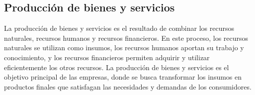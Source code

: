 \documentclass[
  letterpaper,
  DIV=11,
  numbers=noendperiod]{scrartcl}
\begin{document}
\hypertarget{producciuxf3n-de-bienes-y-servicios}{%
\subsection{Producción de bienes y
servicios}\label{producciuxf3n-de-bienes-y-servicios}}

La producción de bienes y servicios es el resultado de combinar los
recursos naturales, recursos humanos y recursos financieros. En este
proceso, los recursos naturales se utilizan como insumos, los recursos
humanos aportan su trabajo y conocimiento, y los recursos financieros
permiten adquirir y utilizar eficientemente los otros recursos. La
producción de bienes y servicios es el objetivo principal de las
empresas, donde se busca transformar los insumos en productos finales
que satisfagan las necesidades y demandas de los consumidores.


\printbibliography
\end{document}
